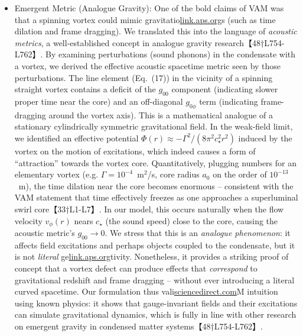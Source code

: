 \documentclass[12pt]{article}
\begin{document}
{{\begin{itemize}
\item 
Emergent Metric (Analogue Gravity): One of the bold claims of VAM was that a spinning vortex could mimic gravitatio\href{https://link.aps.org/doi/10.1103/PhysRevD.9.2273#:~:text=Classical%20direct%20interstring%20action,2273}{link.aps.org}s (such as time dilation and frame dragging). We translated this into the language of \textit{acoustic metrics}, a well-established concept in analogue gravity research【48†L754-L762】. By examining perturbations (sound phonons) in the condensate with a vortex, we derived the effective acoustic spacetime metric seen by those perturbations. The line element (Eq. (17)) in the vicinity of a spinning straight vortex contains a deficit of the $g_{00}$ component (indicating slower proper time near the core) and an off-diagonal $g_{0\phi}$ term (indicating frame-dragging around the vortex axis). This is a mathematical analogue of a stationary cylindrically symmetric gravitational field. In the weak-field limit, we identified an effective potential $\Phi(r)\approx -\Gamma^2/(8\pi^2c_\star^2 r^2)$ induced by the vortex on the motion of excitations, which indeed causes a form of “attraction” towards the vortex core. Quantitatively, plugging numbers for an elementary vortex (e.g. $\Gamma = 10^{-4}$ m$^2$/s, core radius $a_0$ on the order of $10^{-13}$ m), the time dilation near the core becomes enormous – consistent with the VAM statement that time effectively freezes as one approaches a superluminal swirl core【33†L1-L7】. In our model, this occurs naturally when the flow velocity $v_\phi(r)$ nears $c_\star$ (the sound speed) close to the core, causing the acoustic metric’s $g_{00}\to 0$. We stress that this is an \textit{analogue phenomenon}: it affects field excitations and perhaps objects coupled to the condensate, but it is not \textit{literal} ge\href{https://link.aps.org/doi/10.1103/PhysRevD.9.2273#:~:text=Classical%20direct%20interstring%20action,2273}{link.aps.org}tivity. Nonetheless, it provides a striking proof of concept that a vortex defect can produce effects that \textit{correspond} to gravitational redshift and frame dragging – without ever introducing a literal curved spacetime. Our formulation thus vali\href{https://www.sciencedirect.com/science/article/abs/pii/0370269373905935#:~:text=Construction%20of%20Pomeron%20states%20in,View%20full}{sciencedirect.com}M intuition using known physics: it shows that gauge-invariant fields and their excitations can simulate gravitational dynamics, which is fully in line with other research on emergent gravity in condensed matter systems【48†L754-L762】.





\end{itemize}}}
\end{document}
